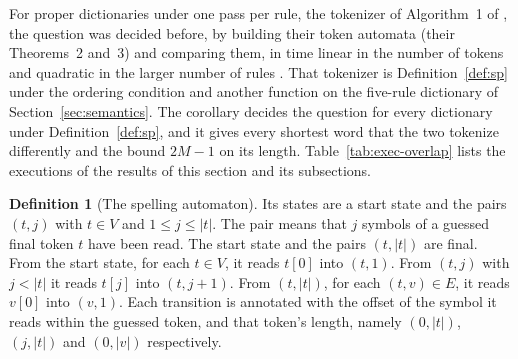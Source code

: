 \documentclass[11pt,a4paper]{article}
\theoremstyle{definition}
\newtheorem{definition}{Definition}
\theoremstyle{plain}
\begin{document}
For proper dictionaries under one pass per rule, the tokenizer of Algorithm~1 of \citet{berglund2024dfa}, the question
was decided before, by building their token automata (their Theorems~2 and~3) and comparing them, in time linear in the
number of tokens and quadratic in the larger number of rules \citep[Theorem~3, p.~10]{bergmark2025equivalence}. That
tokenizer is Definition~\ref{def:sp} under the ordering condition and another function on the five-rule dictionary of
Section~\ref{sec:semantics}. The corollary decides the question for every dictionary under Definition~\ref{def:sp}, and
it gives every shortest word that the two tokenize differently and the bound \(2M - 1\) on its length.
Table~\ref{tab:exec-overlap} lists the executions of the results of this section and its subsections.


\begin{definition}[The spelling automaton]\label{def:spelling}
Its states are a start state and the pairs \((t, j)\) with \(t \in V\) and \(1 \le j \le |t|\). The pair means that
\(j\) symbols of a guessed final token \(t\) have been read. The start state and the pairs \((t, |t|)\) are final. From
the start state, for each \(t \in V\), it reads \(t[0]\) into \((t, 1)\). From \((t, j)\) with \(j < |t|\) it reads
\(t[j]\) into \((t, j + 1)\). From \((t, |t|)\), for each \((t, v) \in E\), it reads \(v[0]\) into \((v, 1)\). Each
transition is annotated with the offset of the symbol it reads within the guessed token, and that token's length, namely
\((0, |t|)\), \((j, |t|)\) and \((0, |v|)\) respectively.
\end{definition}
\end{document}
